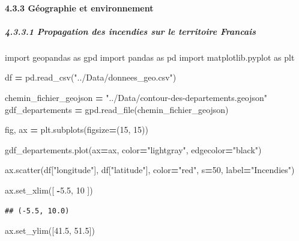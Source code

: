 \documentclass[
]{article}
\newenvironment{Shaded}{\begin{snugshade}}{\end{snugshade}}
\newcommand{\DecValTok}[1]{\textcolor[rgb]{0.00,0.00,0.81}{#1}}
\newcommand{\FloatTok}[1]{\textcolor[rgb]{0.00,0.00,0.81}{#1}}
\newcommand{\ImportTok}[1]{#1}
\newcommand{\NormalTok}[1]{#1}
\newcommand{\OperatorTok}[1]{\textcolor[rgb]{0.81,0.36,0.00}{\textbf{#1}}}
\newcommand{\StringTok}[1]{\textcolor[rgb]{0.31,0.60,0.02}{#1}}
\begin{document}
\paragraph{4.3.3 Géographie et
environnement}\label{guxe9ographie-et-environnement}

\subparagraph{4.3.3.1 Propagation des incendies sur le territoire
Francais}\label{propagation-des-incendies-sur-le-territoire-francais}

\begin{Shaded}
\begin{Highlighting}[]
\ImportTok{import}\NormalTok{ geopandas }\ImportTok{as}\NormalTok{ gpd}
\ImportTok{import}\NormalTok{ pandas }\ImportTok{as}\NormalTok{ pd}
\ImportTok{import}\NormalTok{ matplotlib.pyplot }\ImportTok{as}\NormalTok{ plt}

\NormalTok{df }\OperatorTok{=}\NormalTok{ pd.read\_csv(}\StringTok{"../Data/donnees\_geo.csv"}\NormalTok{)}

\NormalTok{chemin\_fichier\_geojson }\OperatorTok{=} \StringTok{"../Data/contour{-}des{-}departements.geojson"}  
\NormalTok{gdf\_departements }\OperatorTok{=}\NormalTok{ gpd.read\_file(chemin\_fichier\_geojson)}

\NormalTok{fig, ax }\OperatorTok{=}\NormalTok{ plt.subplots(figsize}\OperatorTok{=}\NormalTok{(}\DecValTok{15}\NormalTok{, }\DecValTok{15}\NormalTok{))  }

\NormalTok{gdf\_departements.plot(ax}\OperatorTok{=}\NormalTok{ax, color}\OperatorTok{=}\StringTok{"lightgray"}\NormalTok{, edgecolor}\OperatorTok{=}\StringTok{"black"}\NormalTok{)}

\NormalTok{ax.scatter(df[}\StringTok{"longitude"}\NormalTok{], df[}\StringTok{"latitude"}\NormalTok{], color}\OperatorTok{=}\StringTok{"red"}\NormalTok{, s}\OperatorTok{=}\DecValTok{50}\NormalTok{, label}\OperatorTok{=}\StringTok{"Incendies"}\NormalTok{)  }


\NormalTok{ax.set\_xlim([ }\OperatorTok{{-}}\FloatTok{5.5}\NormalTok{, }\DecValTok{10}\NormalTok{ ])}
\end{Highlighting}
\end{Shaded}

\begin{verbatim}
## (-5.5, 10.0)
\end{verbatim}

\begin{Shaded}
\begin{Highlighting}[]
\NormalTok{ax.set\_ylim([}\FloatTok{41.5}\NormalTok{, }\FloatTok{51.5}\NormalTok{])   }
\end{Highlighting}
\end{Shaded}
\end{document}
